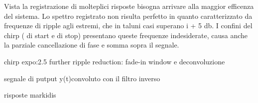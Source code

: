 Vista la registrazione di molteplici risposte bisogna arrivare alla maggior efficenza del sistema.
 Lo spettro registrato non risulta perfetto in quanto caratterizzato da frequenze di ripple agli estremi, che in taluni casi superano i + 5 db. I confini del chirp ( di start e di stop) presentano queste frequenze indesiderate, causa anche la parziale cancellazione di fase e somma sopra il segnale. 


chirp expo:2.5 further ripple reduction: fade-in window  e deconvoluzione

segnale di putput y(t)convoluto con il filtro inverso

risposte markidis


